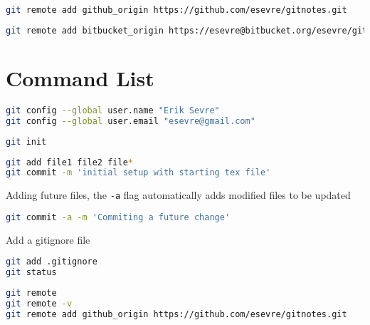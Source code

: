 \documentclass[a4paper]{spie} %
\begin{document}
\begin{lstlisting}[language=bash]
git remote add github_origin https://github.com/esevre/gitnotes.git
\end{lstlisting}
\begin{lstlisting}[language=bash]
git remote add bitbucket_origin https://esevre@bitbucket.org/esevre/gitnotes.git
\end{lstlisting}


\section*{Command List}
\begin{lstlisting}[language=bash]
git config --global user.name "Erik Sevre"
git config --global user.email "esevre@gmail.com"
\end{lstlisting}
\begin{lstlisting}[language=bash]
git init
\end{lstlisting}
\begin{lstlisting}[language=bash]
git add file1 file2 file*
git commit -m 'initial setup with starting tex file'
\end{lstlisting}
Adding future files, the \texttt{-a} flag automatically adds modified files to be updated
\begin{lstlisting}[language=bash]
git commit -a -m 'Commiting a future change'
\end{lstlisting}
Add a gitignore file
\begin{lstlisting}[language=bash]
git add .gitignore
git status
\end{lstlisting}
\begin{lstlisting}[language=bash]
git remote
git remote -v
git remote add github_origin https://github.com/esevre/gitnotes.git

\end{lstlisting}
\end{document}
